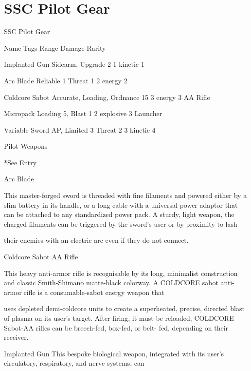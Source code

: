 \section{SSC Pilot Gear}

                                                SSC Pilot Gear  

  Name                  Tags                                       Range            Damage                     Rarity 

 Implanted Gun          Sidearm, Upgrade                           2                1 kinetic                  1 

 Arc Blade              Reliable 1                                 Threat 1         2 energy                   2 

 Coldcore Sabot         Accurate, Loading, Ordnance                15               3 energy                   3 
 AA Rifle 

 Micropack              Loading                                    5, Blast 1       2 explosive                3 
 Launcher 

  Variable Sword        AP, Limited 3                              Threat 2         3 kinetic                  4 

                                                    Pilot Weapons  

*See Entry
 

Arc Blade  

This master-forged sword is threaded with fine filaments and powered either by a slim battery in its handle,  
or a long cable with a universal power adaptor that can be attached to any standardized power pack. A  
sturdy, light weapon, the charged filaments can be triggered by the sword’s user or by proximity to lash  

their enemies with an electric arc even if they do not connect.
 

Coldcore Sabot AA Rifle  

This heavy anti-armor rifle is recognisable by its long, minimalist construction and classic Smith-Shimano  
matte-black colorway. A COLDCORE sabot anti-armor rifle is a consumable-sabot energy weapon that  

uses depleted demi-coldcore units to create a superheated, precise, directed blast of plasma on its user’s  
target. After firing, it must be reloaded; COLDCORE Sabot-AA rifles can be breech-fed, box-fed, or belt- 
fed, depending on their receiver.   

Implanted Gun  
This bespoke biological weapon, integrated with its user’s circulatory, respiratory, and nerve systems, can  

